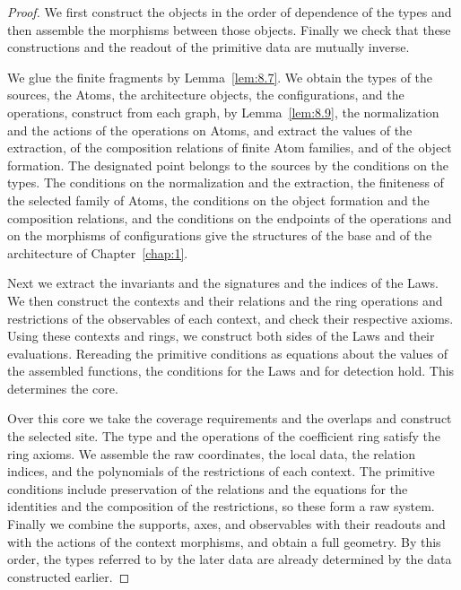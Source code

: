 \begin{proof}

We first construct the objects in the order of dependence of the types and then assemble the
morphisms between those objects.
Finally we check that these constructions and the readout of the primitive data are mutually
inverse.

We glue the finite fragments by Lemma~\ref{lem:8.7}.
We obtain the types of the sources, the Atoms, the architecture objects, the configurations,
and the operations, construct from each graph, by Lemma~\ref{lem:8.9}, the normalization and
the actions of the operations on Atoms, and extract the values of the extraction, of the
composition relations of finite Atom families, and of the object formation.
The designated point belongs to the sources by the conditions on the types.
The conditions on the normalization and the extraction, the finiteness of the selected family
of Atoms, the conditions on the object formation and the composition relations, and the
conditions on the endpoints of the operations and on the morphisms of configurations give the
structures of the base and of the architecture of Chapter~\ref{chap:1}.

Next we extract the invariants and the signatures and the indices of the Laws.
We then construct the contexts and their relations and the ring operations and restrictions
of the observables of each context, and check their respective axioms. Using these contexts
and rings, we construct both sides of the Laws and their evaluations.
Rereading the primitive conditions as equations about the values of the assembled functions,
the conditions for the Laws and for detection hold.
This determines the core.

Over this core we take the coverage requirements and the overlaps and construct the selected
site.
The type and the operations of the coefficient ring satisfy the ring axioms.
We assemble the raw coordinates, the local data, the relation indices, and the polynomials of
the restrictions of each context.
The primitive conditions include preservation of the relations and the equations for the
identities and the composition of the restrictions, so these form a raw system.
Finally we combine the supports, axes, and observables with their readouts and with the
actions of the context morphisms, and obtain a full geometry.
By this order, the types referred to by the later data are already determined by the data
constructed earlier.


\end{proof}
